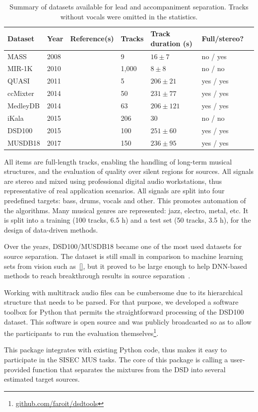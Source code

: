 \begin{table}[htbp]
	\centering
	\caption{Summary of datasets available for lead and accompaniment separation. Tracks without vocals were omitted in the statistics.}
	\label{tab:datasets}
		\begin{tabular}{|l l l l l l l|}
			\hline
			\textbf{Dataset} & \textbf{Year} & \textbf{Reference(s)} & \textbf{Tracks} & \textbf{Track duration (s)} & \textbf{Full/stereo?}\\
			\hline
			MASS & 2008 & \cite{MTGMASSdb} & 9 & $16 \pm 7$ & no / yes \\
			MIR-1K & 2010 & \cite{hsu10} & 1,000 & $8 \pm 8$ & no / no \\
			QUASI & 2011 & \cite{liutkus11,vincent12} & 5 & $206 \pm 21$ & yes / yes \\
			ccMixter & 2014 & \cite{liutkus142} & 50 & $231 \pm 77 $ & yes / yes \\
			MedleyDB & 2014 & \cite{bittner14} & 63 & $206 \pm 121$ & yes / yes \\
			iKala & 2015 & \cite{chan15} & 206 & 30 & no / no \\
			DSD100 & 2015 & \cite{ono15} & 100 & $251 \pm 60$ & yes / yes \\
      MUSDB18 & 2017 & \cite{rafii17} & 150 & $236 \pm 95$ & yes / yes \\
			\hline
		\end{tabular}
\end{table}

All items are full-length tracks, enabling the handling of long-term musical structures, and the evaluation of quality over silent regions for sources. All signals are stereo and mixed using professional digital audio workstations, thus representative of real application scenarios. All signals are split  into four predefined targets: bass, drums, vocals and other. This promotes automation of the algorithms. Many musical genres are represented: jazz, electro, metal, etc. It is split into a training (100 tracks, 6.5 h) and a test set (50 tracks, 3.5 h), for the design of data-driven methods.


Over the years, DSD100/MUSDB18 became one of the most used datasets for source separation. 
The dataset is still small in comparison to machine learning sets from vision such as~\ref{}, but it proved to be large enough to help DNN-based methods to reach breakthrough results in source separation~\cite{stoeter18sisec}.
\par
Working with multitrack audio files can be cumbersome due to its hierarchical structure that needs to be parsed.
For that purpose, we developed a software toolbox for Python that permits the straightforward processing of the DSD100 dataset. This software is open source and was publicly broadcasted so as to allow the participants to run the evaluation themselves\footnote{\url{github.com/faroit/dsdtools}}.
\par
This package integrates with existing Python code, thus makes it easy to participate in the SISEC MUS tasks. The core of this package is calling a user-provided function that separates the mixtures from the DSD into several estimated target sources.

